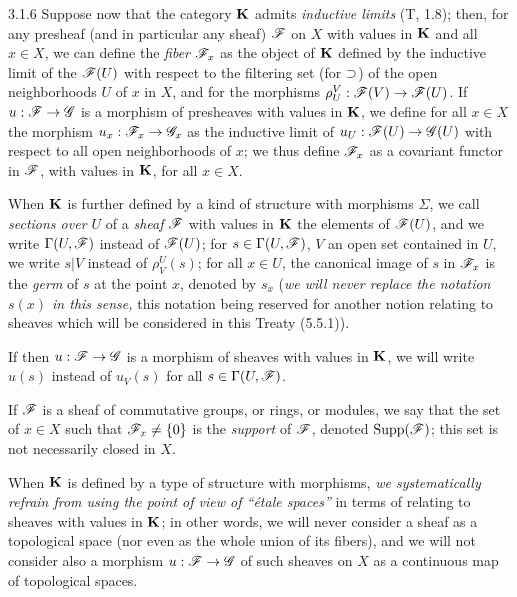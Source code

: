 \documentclass[../main.tex]{subfiles}
\begin{document}
\begin{cx}{3.1.6}
Suppose now that the category $\mathbf{K}$ admits \emph{inductive limits} (T, 1.8);
then, for any presheaf (and in particular any sheaf) $\mathscr{F}$ on $X$ with
values in $\mathbf{K}$ and all $x\in X$, we can define the \emph{fiber} $\mathscr{F}_x$ as the object of $\mathbf{K}$ defined
by the inductive limit of the $\mathscr{F}(U)$ with respect to the filtering set
(for $\supset$) of the open neighborhoods $U$ of $x$ in $X$, and for the morphisms $\rho_U^V:\mathscr{F}(V)\to\mathscr{F}(U)$.
If $u:\mathscr{F}\to\mathscr{G}$ is a morphism of presheaves with values in $\mathbf{K}$, we define for all
$x\in X$ the morphism $u_x:\mathscr{F}_x\to\mathscr{G}_x$ as the inductive limit of $u_U:\mathscr{F}(U)\to\mathscr{G}(U)$ with respect to all
open neighborhoods of $x$; we thus define $\mathscr{F}_x$ as a covariant functor in $\mathscr{F}$, with values in $\mathbf{K}$, for
all $x\in X$.

When $\mathbf{K}$ is further defined by a kind of structure with morphisms $\Sigma$,
we call \emph{sections over $U$} of a \emph{sheaf} $\mathscr{F}$ with values in $\mathbf{K}$ the elements
of $\mathscr{F}(U)$, and we write $\Gamma(U,\mathscr{F})$ instead of $\mathscr{F}(U)$; for $s\in\Gamma(U,\mathscr{F})$, $V$ an open set
contained in $U$, we write $s|V$ instead of $\rho_V^U(s)$; for all $x\in U$, the canonical image
of $s$ in $\mathscr{F}_x$ is the \emph{germ} of $s$ at the point $x$, denoted by $s_x$ (\emph{we will never replace
the notation $s(x)$ in this sense,} this notation being reserved for another notion relating to sheaves
which will be considered in this Treaty (5.5.1)).

If then $u:\mathscr{F}\to\mathscr{G}$ is a morphism of sheaves with values in $\mathbf{K}$, we will write $u(s)$
instead of $u_V(s)$ for all $s\in\Gamma(U,\mathscr{F})$.

If $\mathscr{F}$ is a sheaf of commutative groups, or rings, or modules, we say
that the set of $x\in X$ such that $\mathscr{F}_x\neq\{0\}$ is the \emph{support} of $\mathscr{F}$, denoted
$\operatorname*{Supp}(\mathscr{F})$; this set is not necessarily closed in $X$.

When $\mathbf{K}$ is defined by a type of structure with morphisms, \emph{we
systematically refrain from using the point of view of ``{\'e}tale spaces''} in terms of
relating to sheaves with values in $\mathbf{K}$; in other words, we will never consider
a sheaf as a topological space (nor even as the whole union of its
fibers), and we will not consider also a morphism $u:\mathscr{F}\to\mathscr{G}$ of such sheaves
on $X$ as a continuous map of topological spaces.
\end{cx}
\end{document}
